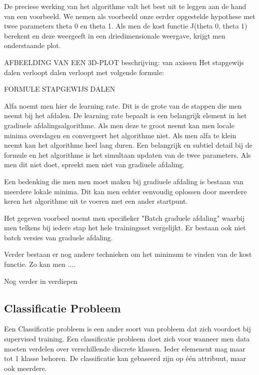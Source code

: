 De preciese werking van het algorithme valt het best uit te leggen aan de hand van een voorbeeld. We nemen als voorbeeld onze eerder opgestelde hypothese met twee parameters theta 0 en theta 1. Als men de kost functie J(theta 0, theta 1) berekent en deze weergeeft in een driedimensionale weergave, krijgt men onderstaande plot.

\newline
AFBEELDING VAN EEN 3D-PLOT
beschrijving: van axissen
\newlien
Het stapgewijs dalen verloopt dalen verloopt met volgende formule:

\newline
FORMULE STAPGEWIJS DALEN
\newline

Alfa noemt men hier de learning rate. Dit is de grote van de stappen die men neemt bij het afdalen. De learning rate bepaalt is een belangrijk element in het gradiuele afdalingsalgorithme. Als men deze te groot neemt kan men locale minima overslagen en convergeert het algorithme niet. Als men alfa te klein neemt kan het algorithme heel lang duren.
Een belangrijk en subtiel detail bij de formule en het algorithme is het simultaan updaten van de twee parameters. Als men dit niet doet, spreekt men niet van gradiuele afdaling.

Een bedenking die men men moet maken bij gradiuele afdaling is bestaan van meerdere lokale minima. Dit kan men echter eenvoudig oplossen door meerdere keren het algorithme uit te voeren met een ander startpunt.

Het gegeven voorbeel noemt men specifieker "Batch graduele afdaling" waarbij men  telkens bij iedere stap het hele trainingsset vergelijkt. Er bestaan ook niet batch versies van graduele afdaling.

Verder bestaan er nog andere technieken om het minimum te vinden van de kost functie. Zo kan men ....

\newline
Nog verder in verdiepen 


\subsection{Classificatie Probleem}\label{Classificatie Probleem}

Een Classificatie probleem is een ander soort van probleem dat zich voordoet bij supervised training. Een classificatie probleem doet zich voor wanneer men data moeten verdelen over verschillende discrete klassen. Ieder elemenent mag maar tot 1 klasse behoren. De classificatie kan gebaseerd zijn op één attribuut, maar ook meerdere.

